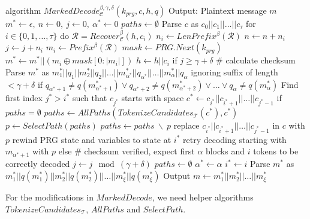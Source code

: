 \begin{Pseudocode}[caption={
$MarkedDecode$ algorithm.
In comparison to Meteor's $Decode$ algorithm, $MarkedDecode$ verifies the checksums $q(m_i)$ of blocks $m_i$.
If the checksum does not match, a decoding error occurred.
It then performs a lookbehind on the stegotext and generates all possible tokenizations $paths$ for a substring of $c$.
Afterwards, it rewinds the internal state and retry decoding with a path $p$ selected from $paths$.
}, label={alg:marked-decode}]
algorithm $MarkedDecode_{\mathcal{C}}^{\beta,\gamma,\delta}(k_{prg}, c, h, q)$
  Output: Plaintext message $m$
  $m^* \leftarrow \epsilon,~ n \leftarrow 0,~ j \leftarrow 0,~ \alpha^* \leftarrow 0$
  $paths \leftarrow \emptyset$
  Parse $c$ as $c_0 || c_1 || \dots || c_{\tau}$
  for $i \in \{ 0, 1, \dots, \tau \}$ do
    $\mathcal{R} = Recover_{\mathcal{C}}^\beta(h, c_i)$
    $n_i \leftarrow LenPrefix^\beta(\mathcal{R})$
    $n \leftarrow n + n_i$
    $j \leftarrow j + n_i$
    $m_i \leftarrow Prefix^\beta(\mathcal{R})$
    $mask \leftarrow PRG.Next(k_{prg})$
    $m^* \leftarrow m^* || (m_i \oplus mask[0: |m_i|])$
    $h \leftarrow h||c_i$
    if $j \geq \gamma + \delta$
      # calculate checksum
      Parse $m^*$ as $m^*_1||q_1||m^*_2||q_2||\dots||m^*_{\alpha^*}||q_{\alpha^*}||\dots||m^*_\alpha||q_\alpha$ ignoring suffix of length $< \gamma+\delta$
      if $q_{\alpha^*+1} \neq q(m^*_{\alpha^*+1}) \lor q_{\alpha^*+2} \neq q(m^*_{\alpha^*+2}) \lor \dots \lor q_\alpha \neq q(m^*_\alpha)$
        Find first index $j^* > i^*$ such that $c_{j^*}$ starts with space
        $c^* \leftarrow c_{i^*} || c_{i^*+1} || \dots || c_{j^*-1}$
        if $paths = \emptyset$
          $paths \leftarrow AllPaths(TokenizeCandidates_{\mathcal{T}}(c^*), c^*)$
        $p \leftarrow SelectPath(paths)$
        $paths \leftarrow paths~ \backslash~ p$
        replace $c_{i^*}||c_{i^*+1}||\dots||c_{j^*-1}$ in $c$ with $p$
        rewind PRG state and variables to state at $i^*$
        retry decoding starting with $m_{\alpha^*+1}$ with $p$
      else  # checksum verified, expect first $\alpha$ blocks and $i$ tokens to be correctly decoded
        $j \leftarrow j \mod (\gamma+\delta)$
        $paths \leftarrow \emptyset$
        $\alpha^* \leftarrow \alpha$
        $i^* \leftarrow i$
  Parse $m^*$ as $m^*_1||q(m^*_1)||m^*_2||q(m^*_2)||\dots||m^*_\xi||q(m^*_\xi)$
  Output $m \leftarrow m^*_1||m^*_2||\dots||m^*_\xi$
\end{Pseudocode}

For the modifications in $MarkedDecode$, we need helper algorithms $TokenizeCandidates_{\mathcal{T}}$, $AllPaths$ and $SelectPath$.


